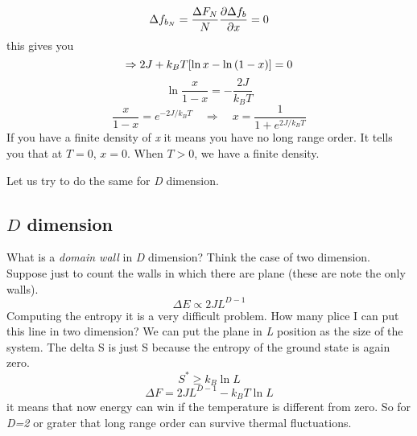 \documentclass[../main/main.tex]{subfiles}
\begin{document}
\begin{equation}
  \Delta f_{b_N} = \frac{\Delta F_N}{N} \pdv{\Delta f_b}{x} = 0
\end{equation}
this gives you
\begin{equation}
  \Rightarrow 2J + k_B T \qty[\ln{x}- \ln{(1-x)}  ] = 0
\end{equation}
\begin{equation}
  \ln{\frac{x}{1-x}} = -\frac{2J}{k_B T}
\end{equation}
\begin{equation}
  \frac{x}{1-x} = e^{-2J/k_BT} \quad \Rightarrow \quad x = \frac{1}{1+e^{2J/k_BT} }
\end{equation}
If you have a finite density of \emph{x} it means you have no long range order. It tells you that at \( T=0 \), \( x=0 \). When \( T > 0 \), we have a finite density.

Let us try to do the same for \emph{D} dimension.

\subsection{\( D \) dimension}
What is a \emph{domain wall} in \emph{D} dimension? Think the case of two dimension. Suppose just to count the walls in which there are plane (these are note the only walls).
\begin{equation}
  \Delta E \propto 2JL^{D-1}
\end{equation}
Computing the entropy it is a very difficult problem. How many plice I can put this line in two dimension? We can put the plane in \emph{L} position as the size of the system. The delta S is just S because the entropy of the ground state is again zero.
\begin{equation}
  S^* \ge k_B \ln{L}
\end{equation}
\begin{equation}
  \Delta F = 2JL^{D-1}-k_B T \ln{L}
\end{equation}
it means that now energy can win if the temperature is different from zero. So for \emph{D=2} or grater that long range order can survive  thermal fluctuations.
\end{document}
